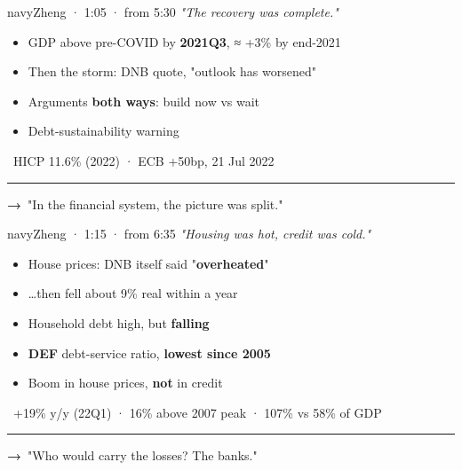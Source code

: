 \documentclass[10pt]{article}
\begin{document}
\begin{card}{navy}{\hfill{\normalsize\mdseries Zheng · 1:05 · from 5:30}}
{\large\itshape "The recovery was complete."}\par\smallskip
\begin{itemize}[label=\textcolor{navy}{\textbullet}]\item GDP above pre-COVID by \textbf{2021Q3}, ≈ +3\% by end-2021\item Then the storm: DNB quote, "outlook has worsened"\item Arguments \textbf{both ways}: build now vs wait\item Debt-sustainability warning\end{itemize}
\smallskip{\color{navy}\textbf{\#}}\ HICP 11.6\% (2022) · ECB +50bp, 21 Jul 2022\par
\vfill\textcolor{grey}{\rule{\linewidth}{0.3pt}}\par{\bfseries\color{navy}→}\ "In the financial system, the picture was split."
\end{card}
\hfill
\begin{card}{navy}{\hfill{\normalsize\mdseries Zheng · 1:15 · from 6:35}}
{\large\itshape "Housing was hot, credit was cold."}\par\smallskip
\begin{itemize}[label=\textcolor{navy}{\textbullet}]\item House prices: DNB itself said "\textbf{overheated}"\item …then fell about 9\% real within a year\item Household debt high, but \textbf{falling}\item \textcolor{gold!80!black}{\textbf{DEF}} debt-service ratio, \textbf{lowest since 2005}\item Boom in house prices, \textbf{not} in credit\end{itemize}
\smallskip{\color{navy}\textbf{\#}}\ +19\% y/y (22Q1) · 16\% above 2007 peak · 107\% vs 58\% of GDP\par
\vfill\textcolor{grey}{\rule{\linewidth}{0.3pt}}\par{\bfseries\color{navy}→}\ "Who would carry the losses? The banks."
\end{card}

\newpage
\end{document}
